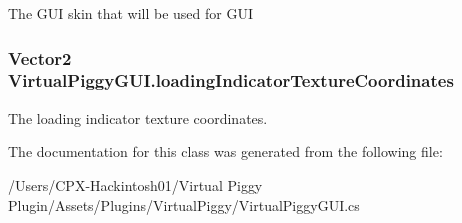 The G\-U\-I skin that will be used for G\-U\-I 

\hypertarget{class_virtual_piggy_g_u_i_a7464dcd32b13809bf7893ce3ad858bdf}{
\subsubsection[{loading\-Indicator\-Texture\-Coordinates}]{\setlength{\rightskip}{0pt plus 5cm}Vector2 Virtual\-Piggy\-G\-U\-I.\-loading\-Indicator\-Texture\-Coordinates}}\label{class_virtual_piggy_g_u_i_a7464dcd32b13809bf7893ce3ad858bdf}


The loading indicator texture coordinates. 



The documentation for this class was generated from the following file\-:\begin{DoxyCompactItemize}
\item 
/\-Users/\-C\-P\-X-\/\-Hackintosh01/\-Virtual Piggy Plugin/\-Assets/\-Plugins/\-Virtual\-Piggy/Virtual\-Piggy\-G\-U\-I.\-cs\end{DoxyCompactItemize}
